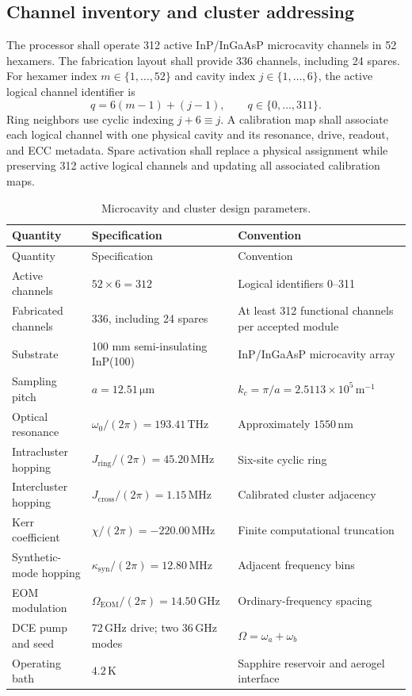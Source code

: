 \documentclass[11pt,a4paper]{article}
\newcommand{\unit}[1]{\,\mathrm{#1}}
\begin{document}
\subsection{Channel inventory and cluster addressing}
The processor shall operate 312 active InP/InGaAsP microcavity channels in 52
hexamers. The fabrication layout shall provide 336 channels, including 24 spares.
For hexamer index $m\in\{1,\ldots,52\}$ and cavity index $j\in\{1,\ldots,6\}$,
the active logical channel identifier is
\[
 q=6(m-1)+(j-1),\qquad q\in\{0,\ldots,311\}.
\]
Ring neighbors use cyclic indexing $j+6\equiv j$. A calibration map shall associate
each logical channel with one physical cavity and its resonance, drive, readout,
and ECC metadata. Spare activation shall replace a physical assignment while
preserving 312 active logical channels and updating all associated calibration maps.

\begin{longtable}{@{}P{4.4cm}P{5.0cm}P{5.5cm}@{}}
\caption{Microcavity and cluster design parameters.}\label{tab:cluster-spec}\\
\toprule Quantity & Specification & Convention\\\midrule\endfirsthead
\toprule Quantity & Specification & Convention\\\midrule\endhead
\bottomrule\endfoot
Active channels & $52\times6=312$ & Logical identifiers 0--311\\
Fabricated channels & 336, including 24 spares & At least 312 functional channels per accepted module\\
Substrate & 100 mm semi-insulating InP(100) & InP/InGaAsP microcavity array\\
Sampling pitch & $a=12.51\unit{\mu m}$ & $k_c=\pi/a=2.5113\times10^5\unit{m^{-1}}$\\
Optical resonance & $\omega_0/(2\pi)=193.41\unit{THz}$ & Approximately $1550\unit{nm}$\\
Intracluster hopping & $J_{\mathrm{ring}}/(2\pi)=45.20\unit{MHz}$ & Six-site cyclic ring\\
Intercluster hopping & $J_{\mathrm{cross}}/(2\pi)=1.15\unit{MHz}$ & Calibrated cluster adjacency\\
Kerr coefficient & $\chi/(2\pi)=-220.00\unit{MHz}$ & Finite computational truncation\\
Synthetic-mode hopping & $\kappa_{\mathrm{syn}}/(2\pi)=12.80\unit{MHz}$ & Adjacent frequency bins\\
EOM modulation & $\Omega_{\mathrm{EOM}}/(2\pi)=14.50\unit{GHz}$ & Ordinary-frequency spacing\\
DCE pump and seed & $72\unit{GHz}$ drive; two $36\unit{GHz}$ modes & $\Omega=\omega_a+\omega_b$\\
Operating bath & $4.2\unit K$ & Sapphire reservoir and aerogel interface\\
\end{longtable}
\end{document}
